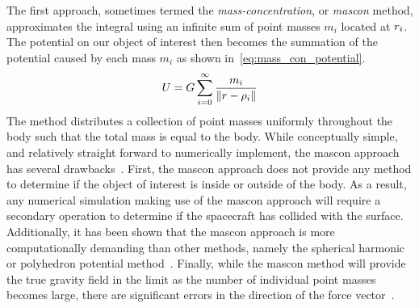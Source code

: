 The first approach, sometimes termed the \textit{mass-concentration}, or \textit{mascon} method, approximates the integral using an infinite sum of point masses \( m_i\) located at \( r_i \).
The potential on our object of interest then becomes the summation of the potential caused by each mass \( m_i \) as shown in~\cref{eq:mass_con_potential}.
\begin{align}\label{eq:mass_con_potential}
    U = G \sum_{i=0}^{\infty} \frac{m_i}{\left\| r - \rho_i \right\|}
\end{align}
The method distributes a collection of point masses uniformly throughout the body such that the total mass is equal to the body.
While conceptually simple, and relatively straight forward to numerically implement, the mascon approach has several drawbacks~\cite{scheeres2012a}.
First, the mascon approach does not provide any method to determine if the object of interest is inside or outside of the body.
As a result, any numerical simulation making use of the mascon approach will require a secondary operation to determine if the spacecraft has collided with the surface.
Additionally, it has been shown that the mascon approach is more computationally demanding than other methods, namely the spherical harmonic or polyhedron potential method~\cite{werner1996}.
Finally, while the mascon method will provide the true gravity field in the limit as the number of individual point masses becomes large, there are significant errors in the direction of the force vector~\cite{werner1996}.

